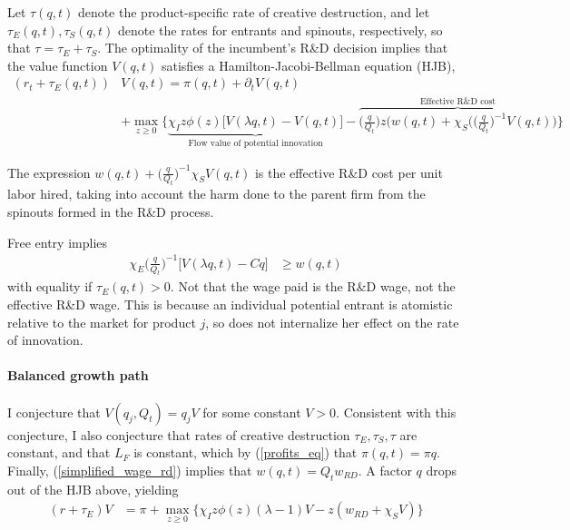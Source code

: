 \documentclass[11pt,english]{article}
\theoremstyle{remark}
\begin{document}
Let $\tau(q,t)$ denote the product-specific rate of creative destruction, and let $\tau_E(q,t),\tau_S(q,t)$ denote the rates for entrants and spinouts, respectively, so that $\tau = \tau_E + \tau_S$. The optimality of the incumbent's R\&D decision implies that the value function $V(q,t)$ satisfies a Hamilton-Jacobi-Bellman equation (HJB),
\begin{align}
	(r_t + \tau_E(q,t)) &V(q,t) = \pi(q,t) + \partial_tV(q,t) \nonumber \\ 
	                         &+ \max_{z \ge 0} \Bigg\{ \underbrace{\chi_I z\phi(z) \Big[V(\lambda q,t) - V(q,t) \Big]}_{\textrm{Flow value of potential innovation}} - \overbrace{\Big(\frac{q}{Q_t}\Big) z \Big( w(q,t) + \chi_S \Big( \Big(\frac{q}{Q_t}\Big)^{-1} V(q,t) \Big)}^{\textrm{Effective R\&D cost}} \Bigg\}
\end{align}

The expression $w(q,t) +\Big(\frac{q}{Q_t}\Big)^{-1} \chi_S V(q,t)$ is the effective R\&D cost per unit labor hired, taking into account the harm done to the parent firm from the spinouts formed in the R\&D process.

Free entry implies
\begin{align}
	\chi_E \Big(\frac{q}{Q_t}\Big)^{-1} \Big[ V(\lambda q,t) - Cq \Big]  &\ge w(q,t)  \nonumber
\end{align}
with equality if $\tau_E(q,t) > 0$. Not that the wage paid is the R\&D wage, not the effective R\&D wage. This is because an individual potential entrant is atomistic relative to the market for product $j$, so does not internalize her effect on the rate of innovation.

\paragraph{Balanced growth path}

I conjecture that $V(q_j,Q_t) = q_j V$ for some constant $V > 0$. Consistent with this conjecture, I also conjecture that rates of creative destruction $\tau_E,\tau_S,\tau$ are constant, and that $L_F$ is constant, which by (\ref{profits_eq}) that $\pi(q,t) = \pi q$. Finally, (\ref{simplified_wage_rd}) implies that $w(q,t) = Q_t w_{RD}$. A factor $q$ drops out of the HJB above, yielding
\begin{align}
	(r + \tau_E) V &= \pi + \max_{z \ge 0} \Big\{  \chi_I z \phi(z) (\lambda -1) V - z (w_{RD} + \chi_S V ) \Big\} \label{simplified_BGP_HJB_I}
\end{align} 
\end{document}
